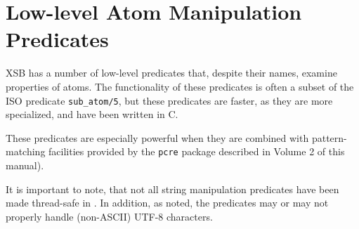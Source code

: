 
\section{Low-level Atom Manipulation Predicates}
\label{sec-strings}

XSB has a number of low-level predicates that, despite their names,
examine properties of atoms.  The functionality of these predicates is
often a subset of the ISO predicate {\tt sub\_atom/5}, but these
predicates are faster, as they are more specialized, and have been
written in C.

These predicates are especially powerful when they are combined with
pattern-matching facilities provided by the {\tt pcre} package
described in Volume 2 of this manual).

It is important to note, that not all string manipulation predicates
have been made thread-safe in \version{}.  In addition, as noted, the
predicates may or may not properly handle (non-ASCII) UTF-8
characters.

